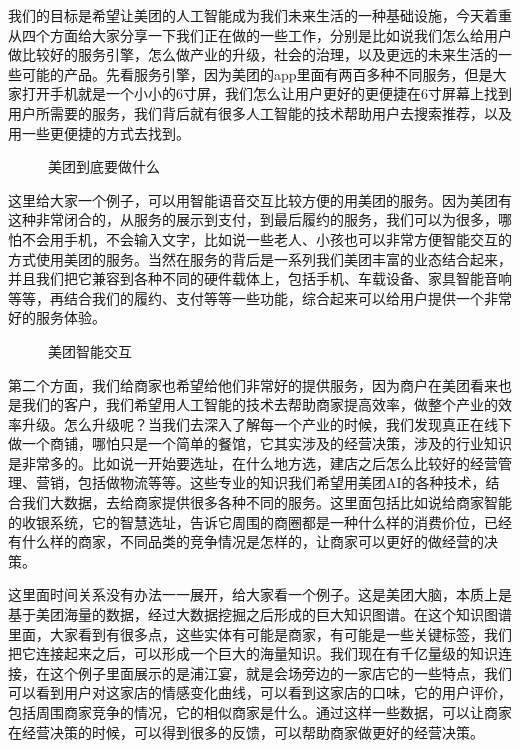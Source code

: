 \documentclass[letterpaper,11pt,english]{sphinxmanual}
\begin{document}
我们的目标是希望让美团的人工智能成为我们未来生活的一种基础设施，今天着重从四个方面给大家分享一下我们正在做的一些工作，分别是比如说我们怎么给用户做比较好的服务引擎，怎么做产业的升级，社会的治理，以及更远的未来生活的一些可能的产品。先看服务引擎，因为美团的app里面有两百多种不同服务，但是大家打开手机就是一个小小的6寸屏，我们怎么让用户更好的更便捷在6寸屏幕上找到用户所需要的服务，我们背后就有很多人工智能的技术帮助用户去搜索推荐，以及用一些更便捷的方式去找到。

\begin{figure}[H]
\centering
\capstart

\noindent{}
\caption{美团到底要做什么}\label{\detokenize{chapter_company/meituan:id24}}\end{figure}

这里给大家一个例子，可以用智能语音交互比较方便的用美团的服务。因为美团有这种非常闭合的，从服务的展示到支付，到最后履约的服务，我们可以为很多，哪怕不会用手机，不会输入文字，比如说一些老人、小孩也可以非常方便智能交互的方式使用美团的服务。当然在服务的背后是一系列我们美团丰富的业态结合起来，并且我们把它兼容到各种不同的硬件载体上，包括手机、车载设备、家具智能音响等等，再结合我们的履约、支付等等一些功能，综合起来可以给用户提供一个非常好的服务体验。

\begin{figure}[H]
\centering
\capstart

\noindent{}
\caption{美团智能交互}\label{\detokenize{chapter_company/meituan:id25}}\end{figure}

第二个方面，我们给商家也希望给他们非常好的提供服务，因为商户在美团看来也是我们的客户，我们希望用人工智能的技术去帮助商家提高效率，做整个产业的效率升级。怎么升级呢？当我们去深入了解每一个产业的时候，我们发现真正在线下做一个商铺，哪怕只是一个简单的餐馆，它其实涉及的经营决策，涉及的行业知识是非常多的。比如说一开始要选址，在什么地方选，建店之后怎么比较好的经营管理、营销，包括做物流等等。这些专业的知识我们希望用美团AI的各种技术，结合我们大数据，去给商家提供很多各种不同的服务。这里面包括比如说给商家智能的收银系统，它的智慧选址，告诉它周围的商圈都是一种什么样的消费价位，已经有什么样的商家，不同品类的竞争情况是怎样的，让商家可以更好的做经营的决策。

这里面时间关系没有办法一一展开，给大家看一个例子。这是美团大脑，本质上是基于美团海量的数据，经过大数据挖掘之后形成的巨大知识图谱。在这个知识图谱里面，大家看到有很多点，这些实体有可能是商家，有可能是一些关键标签，我们把它连接起来之后，可以形成一个巨大的海量知识。我们现在有千亿量级的知识连接，在这个例子里面展示的是浦江宴，就是会场旁边的一家店它的一些特点，我们可以看到用户对这家店的情感变化曲线，可以看到这家店的口味，它的用户评价，包括周围商家竞争的情况，它的相似商家是什么。通过这样一些数据，可以让商家在经营决策的时候，可以得到很多的反馈，可以帮助商家做更好的经营决策。
\end{document}
